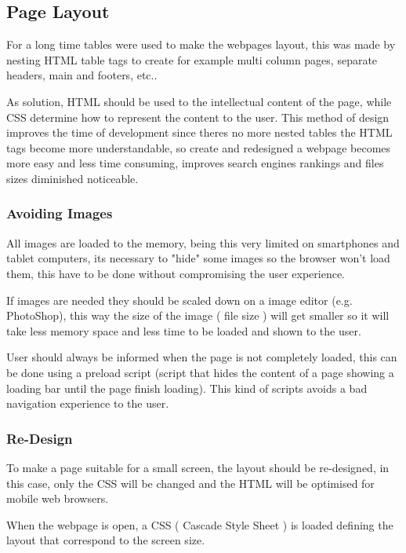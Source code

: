 \subsection{Page Layout}

For a long time tables were used to make the webpages layout, this was made by nesting HTML table tags to create for example multi column pages, separate headers, main and footers, etc..

As solution, HTML should be used to the intellectual content of the page, while CSS determine how to represent the content to the user. This method of design improves the time of development since theres no more nested tables the HTML tags become more understandable, so create and redesigned a webpage becomes more easy and less time consuming, improves search engines rankings and files sizes diminished noticeable.\\

\subsubsection{Avoiding Images}

All images are loaded to the memory, being this very limited on smartphones and tablet computers, its necessary to "hide" some images so the browser won't load them, this have to be done without compromising the user experience.

If images are needed they should be scaled down on a image editor (e.g. PhotoShop), this way the size of the image ( file size ) will get smaller so it will take less memory space and less time to be loaded and shown to the user.

User should always be informed when the page is not completely loaded, this can be done using a preload script (script that hides the content of a page showing a loading bar until the page finish loading). This kind of scripts avoids a bad navigation experience to the user.

\subsubsection{Re-Design}

To make a page suitable for a small screen, the layout should be re-designed, in this case, only the CSS will be changed and the HTML will be optimised for mobile web browsers.

When the webpage is open, a CSS ( Cascade Style Sheet ) is loaded defining the layout that correspond to the screen size.

